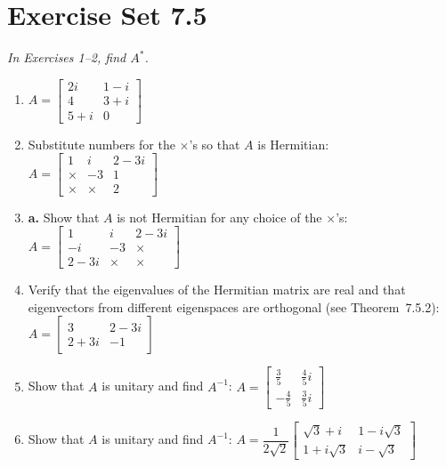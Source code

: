 \documentclass{article}
\begin{document}
\section*{Exercise Set 7.5}

\noindent\textit{In Exercises 1--2, find $A^*$.}

\begin{enumerate}
  \item[(1)] $A = \begin{bmatrix} 2i & 1-i \\ 4 & 3+i \\ 5+i & 0 \end{bmatrix}$

  \item[(3)] Substitute numbers for the $\times$'s so that $A$ is Hermitian:
  $A = \begin{bmatrix} 1 & i & 2-3i \\ \times & -3 & 1 \\ \times & \times & 2 \end{bmatrix}$

  \item[(5)] \textbf{a.} Show that $A$ is not Hermitian for any choice of the $\times$'s:
  $A = \begin{bmatrix} 1 & i & 2-3i \\ -i & -3 & \times \\ 2-3i & \times & \times \end{bmatrix}$

  \item[(7)] Verify that the eigenvalues of the Hermitian matrix are real and that
  eigenvectors from different eigenspaces are orthogonal (see Theorem~7.5.2):
  $A = \begin{bmatrix} 3 & 2-3i \\ 2+3i & -1 \end{bmatrix}$

  \item[(9)] Show that $A$ is unitary and find $A^{-1}$:
  $A = \begin{bmatrix} \tfrac{3}{5} & \tfrac{4}{5}i \\ -\tfrac{4}{5} & \tfrac{3}{5}i \end{bmatrix}$

  \item[(11)] Show that $A$ is unitary and find $A^{-1}$:
  $A = \dfrac{1}{2\sqrt{2}}\begin{bmatrix} \sqrt{3}+i & 1-i\sqrt{3} \\ 1+i\sqrt{3} & i-\sqrt{3} \end{bmatrix}$
\end{enumerate}
\end{document}
